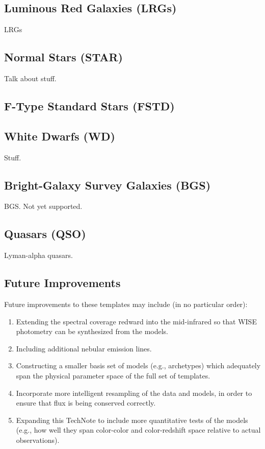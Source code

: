 \documentclass[12pt]{article}
\begin{document}
\subsection{Luminous Red Galaxies (LRGs)}

LRGs


\subsection{Normal Stars (STAR)}

Talk about stuff.

\subsection{F-Type Standard Stars (FSTD)}

\subsection{White Dwarfs (WD)}

Stuff.

\subsection{Bright-Galaxy Survey Galaxies (BGS)}

BGS.  Not yet supported.

\subsection{Quasars (QSO)}

Lyman-alpha quasars.

\subsection{Future Improvements}

Future improvements to these templates may include (in no particular
order): 

\begin{enumerate}
\item{Extending the spectral coverage redward into the mid-infrared so
  that WISE photometry can be synthesized from the models.}
\item{Including additional nebular emission lines.}
\item{Constructing a smaller basis set of models (e.g., archetypes)
  which adequately span the physical parameter space of the full set
  of templates.}
\item{Incorporate more intelligent resampling of the data and models,
  in order to ensure that flux is being conserved correctly.}
\item{Expanding this TechNote to include more quantitative tests of
  the models (e.g., how well they span color-color and color-redshift
  space relative to actual observations).}
\end{enumerate}
\end{document}
